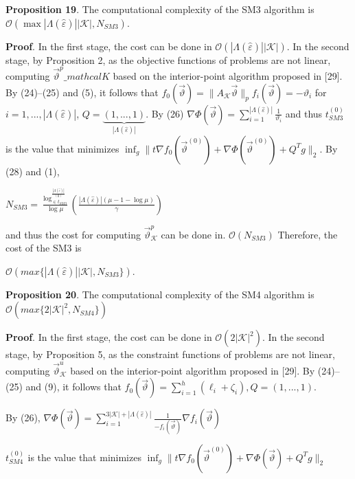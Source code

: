 \documentclass[10pt,a4paper]{IOS-Book-Article}
\begin{document}
\textbf{Proposition 19}. The computational complexity of the
SM3 algorithm is $\mathcal{O}(\max{|\Lambda(\hat{\varepsilon} )| |\mathcal{K}|,N_{SM3}})$.

\textbf{Proof}. In the first stage, the cost can be done in
$\mathcal{O}(|\Lambda(\hat{\varepsilon})| |\mathcal{K}|)$. In the second stage, by Proposition
2, as the objective functions of problems are not
linear, computing $\vec{\vartheta}^p\_mathcal{K}$
based on the interior-point algorithm
proposed in [29]. By (24)–(25) and (5), it
follows that $f_0(\vec{\vartheta}) = \parallel A_\mathcal{K}\vec{\vartheta}\parallel_p f_i(\vec{\vartheta}) = −\vartheta_i$ for $i =
1, ... , |\Lambda(\hat{\varepsilon})|$, $Q = \underbrace{(1, ... , 1)}_{|\Lambda(\hat{\varepsilon})|}$. By (26) $\nabla \Phi \left( \vec{\vartheta} \right) = \sum^{|\Lambda(\hat{\varepsilon})|}_{i=1} \frac{1}{\vartheta_i}$
and thus $t^{(0)}_{SM3}$ is the value that minimizes
$\inf_g \parallel t \nabla f_0 \left( \vec{\vartheta}^{(0)} \right) +\nabla \Phi \left( \vec{\vartheta}^{(0)} \right)+  Q^T g \parallel _2$. By (28)
and (1),

$N_{SM3} = \frac{ \log^{\frac{|\Lambda(\hat{\varepsilon})|}{(0)}}_{\in t_{SM3}}}{\log\mu} \left( \frac{ |\Lambda(\hat{\varepsilon})| (\mu − 1 − \log\mu)}{\gamma} \right)$

and thus the cost for computing $\vec{\vartheta}^p_\mathcal{K}$ can be done
in. $\mathcal{O}(N_{SM3})$ Therefore, the cost of the SM3 is

$\mathcal{O}(max\{|\Lambda(\hat{\varepsilon})| |\mathcal{K}|,N_{SM3}\})$.

\textbf{Proposition 20}. The computational complexity of the
SM4 algorithm is $\mathcal{O}(max\{2|\mathcal{K}|^2,N_{SM4}\})$

\textbf{Proof}. In the first stage, the cost can be done in
$\mathcal{O}(2 |\mathcal{K}|^2)$. In the second stage, by Proposition 5, as
the constraint functions of problems are not linear,
computing $\vec{\vartheta}^u_\mathcal{K}$
based on the interior-point algorithm
proposed in [29]. By (24)–(25) and (9), it follows that
$f_0\left(\vec{\vartheta}\right) = \sum^h_{i=1}(\ell_i + \zeta_i),Q = (1, ... , 1)$. 

By (26), $\nabla \Phi \left( \vec{\vartheta} \right) = \sum^{3|\mathcal{K}|+|\Lambda(\hat{\varepsilon})|}_{i=1} \frac{1}{−f_i\left(\vec{\vartheta}\right)} \nabla f_i \left( \vec{\vartheta} \right)$

$t^{(0)}_{SM4}$ is the value that minimizes
$\inf_g \parallel t\nabla f_0 \left( \vec{\vartheta}^(0) \right) + \nabla \Phi \left( \vec{\vartheta} \right) + Q^T g \parallel_2$
\end{document}
